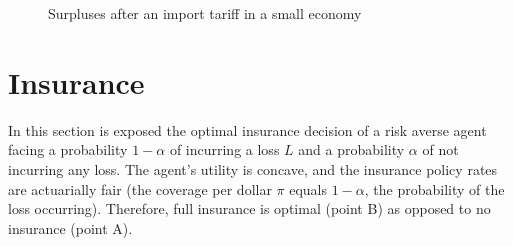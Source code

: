 \documentclass[english]{article}
\begin{document}
\begin{figure}[H]
\begin{center}
\caption[Import tariff - small economy]{Surpluses after an import tariff in a small economy}
\end{center}	
\end{figure}

\section{Insurance}
In this section is exposed the optimal insurance decision of a risk averse agent facing a probability $1-\alpha$ of incurring a loss $L$ and a probability $\alpha$ of not incurring any loss. The agent's utility is concave, and the insurance policy rates are actuarially fair (the coverage per dollar $\pi$ equals $1-\alpha$, the probability of the loss occurring). Therefore, full insurance is optimal (point B) as opposed to no insurance (point A).
\end{document}
